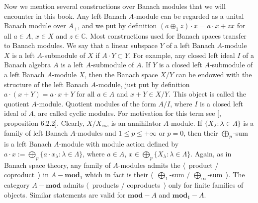 Now we mention several constructions over Banach modules that we will encounter
in this book.  Any left Banach $A$-module can be regarded as a unital Banach
module over $A_+$, and we put by definition $(a\oplus_1 z)\cdot x=a\cdot x+zx$
for all $a\in A$, $x\in X$ and $z\in\mathbb{C}$. Most constructions used for
Banach spaces transfer to Banach modules.  We say that a linear subspace $ Y$ of
a left Banach $A$-module $X$ is a left $A$-submodule of $X$ 
if $A\cdot Y\subset Y$. For example, any closed left ideal $I$ of a 
Banach algebra $A$ is a left $A$-submodule of $A$. If $Y$ is a closed left
$A$-submodule of a left Banach $A$-module $X$, then the Banach space $X/Y$ can
be endowed with the structure of the left Banach $A$-module, just put by
definition $a\cdot(x+Y)=a\cdot x+Y$ for all $a\in A$ and $x+Y\in X/Y$. This
object is called the quotient $A$-module. Quotient modules of the form $A/I$,
where $I$ is a closed left ideal of $A$, are called cyclic modules. For motivation for
this term see [\cite{HelBanLocConvAlg}, proposition 6.2.2]. Clearly, $X/X_{ess}$
is an annihilator $A$-module. If $ \{X_\lambda:\lambda\in\Lambda \}$ is a family of left Banach
$A$-modules and $1\leq p\leq +\infty$ or $p=0$, then their $\bigoplus_p$-sum is
a left Banach $A$-module with module action defined 
by $a\cdot x:=\bigoplus_p \{a\cdot x_\lambda:\lambda\in\Lambda \}$, 
where $a\in A$, $x\in\bigoplus_p \{X_\lambda:\lambda\in\Lambda \}$. 
Again, as in Banach space theory, any family
of $A$-modules admits the $\langle$~product / coproduct~$\rangle$ in
$A-\mathbf{mod}_1$ which in fact is their $\langle$~$\bigoplus_1$-sum /
$\bigoplus_\infty$-sum~$\rangle$. The category $A-\mathbf{mod}$ admits
$\langle$~products / coproducts~$\rangle$ only for finite families of objects.
Similar statements are valid for $\mathbf{mod}-A$ and $\mathbf{mod}_1-A$.

